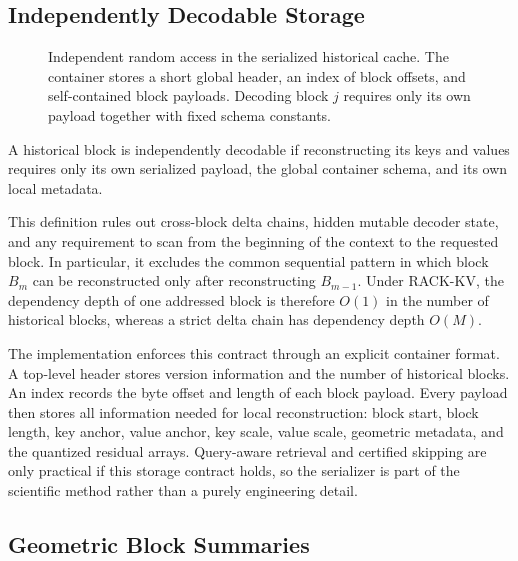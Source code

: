 \subsection{Independently Decodable Storage}

\begin{figure}[t]
  \centering
  
  \caption{Independent random access in the serialized historical cache. The container stores a short global header, an index of block offsets, and self-contained block payloads. Decoding block \(j\) requires only its own payload together with fixed schema constants.}
  \label{fig:blockformat}
\end{figure}

\begin{definition}
  A historical block is independently decodable if reconstructing its keys and values requires only its own serialized payload, the global container schema, and its own local metadata.
\end{definition}

This definition rules out cross-block delta chains, hidden mutable decoder state, and any requirement to scan from the beginning of the context to the requested block. In particular, it excludes the common sequential pattern in which block \(B_m\) can be reconstructed only after reconstructing \(B_{m-1}\). Under RACK-KV, the dependency depth of one addressed block is therefore \(O(1)\) in the number of historical blocks, whereas a strict delta chain has dependency depth \(O(M)\).

The implementation enforces this contract through an explicit container format. A top-level header stores version information and the number of historical blocks. An index records the byte offset and length of each block payload. Every payload then stores all information needed for local reconstruction: block start, block length, key anchor, value anchor, key scale, value scale, geometric metadata, and the quantized residual arrays. Query-aware retrieval and certified skipping are only practical if this storage contract holds, so the serializer is part of the scientific method rather than a purely engineering detail.

\subsection{Geometric Block Summaries}

